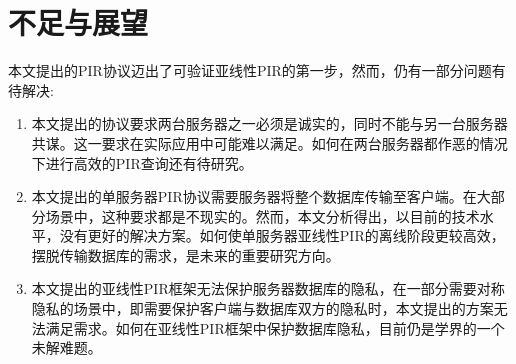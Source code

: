 \section{不足与展望}
本文提出的PIR协议迈出了可验证亚线性PIR的第一步，然而，仍有一部分问题有待解决:
\begin{enumerate}
    \item 本文提出的协议要求两台服务器之一必须是诚实的，同时不能与另一台服务器共谋。这一要求在实际应用中可能难以满足。如何在两台服务器都作恶的情况下进行高效的PIR查询还有待研究。
    \item 本文提出的单服务器PIR协议需要服务器将整个数据库传输至客户端。在大部分场景中，这种要求都是不现实的。然而，本文分析得出，以目前的技术水平，没有更好的解决方案。如何使单服务器亚线性PIR的离线阶段更较高效，摆脱传输数据库的需求，是未来的重要研究方向。
    \item 本文提出的亚线性PIR框架无法保护服务器数据库的隐私，在一部分需要对称隐私的场景中，即需要保护客户端与数据库双方的隐私时，本文提出的方案无法满足需求。如何在亚线性PIR框架中保护数据库隐私，目前仍是学界的一个未解难题。
\end{enumerate}